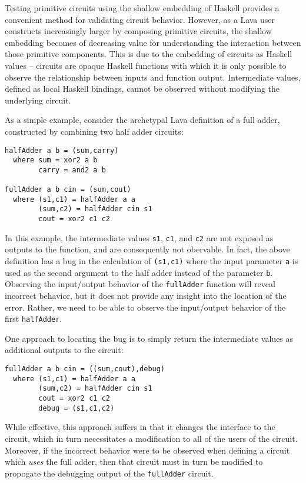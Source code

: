 \documentclass{llncs}
\begin{document}
Testing primitive circuits using the shallow embedding of Haskell provides a
convenient method for validating circuit behavior. However, as a Lava user
constructs increasingly larger by composing primitive circuits, the shallow
embedding becomes of decreasing value for understanding the interaction between
those primitive components. This is due to the embedding of circuits as Haskell
values -- circuits are opaque Haskell functions with which it is only possible
to observe the relationship between inputs and function output. Intermediate
values, defined as local Haskell bindings, cannot be observed without modifying
the underlying circuit.

As a simple example, consider the archetypal Lava definition of a full adder,
constructed by combining two half adder circuits:

\begin{verbatim}
halfAdder a b = (sum,carry)
  where sum = xor2 a b
        carry = and2 a b

fullAdder a b cin = (sum,cout)
  where (s1,c1) = halfAdder a a
        (sum,c2) = halfAdder cin s1
        cout = xor2 c1 c2
\end{verbatim}


In this example, the intermediate values \verb!s1!, \verb!c1!, and \verb!c2! are
not exposed as outputs to the function, and are consequently not
obervable. In fact, the above definition has a bug in the calculation of
\verb!(s1,c1)! where the input parameter \verb!a! is used as the second argument
to the half adder instead of the parameter \verb!b!. Observing the input/output
behavior of the \verb!fullAdder! function will reveal incorrect behavior, but it
does not provide any insight into the location of the error. Rather, we need to
be able to observe the input/output behavior of the first \verb!halfAdder!.

One approach to locating the bug is to simply return the intermediate values as
additional outputs to the circuit:

\begin{verbatim}
fullAdder a b cin = ((sum,cout),debug)
  where (s1,c1) = halfAdder a a
        (sum,c2) = halfAdder cin s1
        cout = xor2 c1 c2
        debug = (s1,c1,c2)
\end{verbatim}

While effective, this approach suffers in that it changes the interface to the
circuit, which in turn necessitates a modification to all of the users of the
circuit. Moreover, if the incorrect behavior were to be observed when defining a
circuit which \emph{uses} the full adder, then that circuit must in turn be
modified to propogate the debugging output of the \verb!fullAdder!  circuit.
\end{document}
